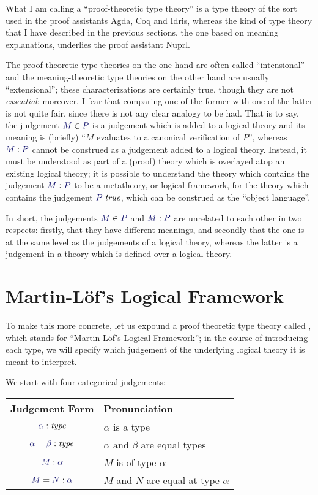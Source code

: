 \documentclass[main.tex]{subfiles}
\begin{document}
What I am calling a ``proof-theoretic type theory'' is a type theory of the
sort used in the proof assistants Agda, Coq and Idris, whereas the kind of
type theory that I have described in the previous sections, the one based on
meaning explanations, underlies the proof assistant Nuprl.

The proof-theoretic type theories on the one hand are often called
``intensional'' and the meaning-theoretic type theories on the other
hand are usually ``extensional''; these characterizations are
certainly true, though they are not \emph{essential}; moreover, I fear
that comparing one of the former with one of the latter is not quite
fair, since there is not any clear analogy to be had. That is to say,
the judgement $\ver{M}{P}$ is a judgement which is added to a logical
theory and its meaning is (briefly) ``$M$ evaluates to a canonical
verification of $P$'', whereas $\ofty{M}{P}$ cannot be construed as a
judgement added to a logical theory. Instead, it must be understood as
part of a (proof) theory which is overlayed atop an existing logical theory;
it is possible to understand the theory which contains the judgement
$\ofty{M}{P}$ to be a metatheory, or logical framework, for the theory which
contains the judgement $\istrue{P}$, which can be construed as the
``object language''.

In short, the judgements $\ver{M}{P}$ and $\ofty{M}{P}$ are unrelated to each other in
two respects: firstly, that they have different meanings, and secondly that the
one is at the same level as the judgements of a logical theory, whereas the
latter is a judgement in a theory which is defined over a logical theory.

\section{Martin-L\"of's Logical Framework}

To make this more concrete, let us expound a proof theoretic type
theory called \MLLF, which stands for ``Martin-L\"of's Logical
Framework''; in the course of introducing each type, we will specify
which judgement of the underlying logical theory it is meant to
interpret.

We start with four categorical judgements:\\

\begin{tabular}{c|l}
Judgement Form & Pronunciation \\ \hline
  $\type{\alpha}$ & $\alpha$ is a type \\
  $\etype{\alpha}{\beta}$ & $\alpha$ and $\beta$ are equal types \\
  $\ofty{M}{\alpha}$ & $M$ is of type $\alpha$ \\
  $\eofty{M}{N}{\alpha}$ & $M$ and $N$ are equal at type $\alpha$ \\
\end{tabular}\\
\end{document}
